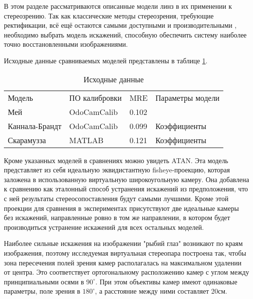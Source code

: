 
В этом разделе рассматриваются описанные модели линз в их применении к стереозрению. 
Так как классические методы стереозрения, требующие ректификации, всё ещё остаются самыми доступными и производительными \cite{disparity_review}, 
необходимо выбрать модель искажений, способную обеспечить систему наиболее точно восстановленными изображениями. 

Исходные данные сравниваемых моделей представлены в таблице \ref{tab:models_params}.

\begin{table}[]
    \centering
    \caption{Исходные данные}
    \label{tab:models_params}
    \begin{tabular}{llll}
    Модель         & ПО калибровки & MRE   & Параметры модели \\
    Мей            & OdoCamCalib   & 0.102 &                  \\
    Каннала-Брандт & OdoCamCalib   & 0.099 & Коэффициенты     \\
    Скарамузза     & MATLAB        & 0.121 & Коэффициенты    
    \end{tabular}
\end{table}

Кроме указанных моделей в сравнениях можно увидеть ATAN. Эта модель представляет из себя идеальную эквидистантную fisheye-проекцию, 
которая заложена в использованную виртуальную широкоугольную камеру. 
Она добавлена к сравнению как эталонный способ устранения искажений из предположения, что с ней результаты стереосопоставления будут 
самыми лучшими.  
Кроме этой проекции для сравнения в экспериментах присутствуют две идеальные камеры без искажений, направленные
ровно в том же направлении, в котором будет производиться устранение  искажений для всех остальных моделей.  

Наиболее сильные искажения на изображении "рыбий глаз" возникают по краям изображения, поэтому исследуемая виртуальная стереопара построена так,
чтобы зона пересечения полей зрения камер располагалась на максимальном удалении от центра. Это соответствует ортогональному расположению
камер с углом между принципиальными осями в $90^\circ$.  При этом объективы камер имеют одинаковые параметры, поле зрения в $180^\circ$,
 а расстояние между ними составляет 20см. %

